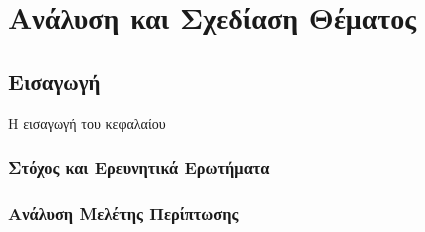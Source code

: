 

    

\chapter{Ανάλυση και Σχεδίαση Θέματος}
\section{Εισαγωγή}
Η εισαγωγή του κεφαλαίου
\subsection{ Στόχος και Ερευνητικά Ερωτήματα}
\subsection{ Ανάλυση Μελέτης Περίπτωσης}
\clearpage
